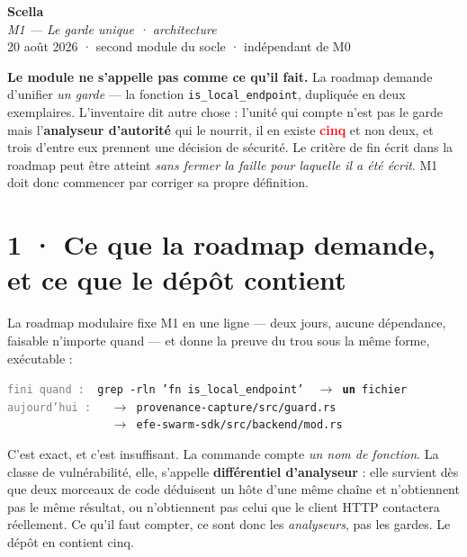 \documentclass[10pt]{article}
\newcommand{\pire}[1]{\textcolor{red}{\textbf{#1}}}
\newcommand{\sz}[1]{\textcolor{grey}{\small\textsf{#1}}}
\newcommand{\code}[1]{\texttt{\small #1}}
\newcommand{\fl}{$\rightarrow$}
\begin{document}
\begin{center}
{\Huge\bfseries\color{navy} Scella}\\[4pt]
{\large\color{grey}\itshape M1 --- Le garde unique · architecture}\\[4pt]
{\small\color{grey} 20 août 2026 \; · \; second module du socle \; · \; indépendant de M0}
\end{center}
\vspace{2pt}

\begin{these}
\textbf{Le module ne s'appelle pas comme ce qu'il fait.} La roadmap demande d'unifier \emph{un
garde} --- la fonction \code{is\_local\_endpoint}, dupliquée en deux exemplaires. L'inventaire dit
autre chose : l'unité qui compte n'est pas le garde mais l'\textbf{analyseur d'autorité} qui le
nourrit, il en existe \pire{cinq} et non deux, et trois d'entre eux prennent une décision de
sécurité. Le critère de fin écrit dans la roadmap peut être atteint \emph{sans fermer la faille pour
laquelle il a été écrit}. M1 doit donc commencer par corriger sa propre définition.
\end{these}

\section{1 · Ce que la roadmap demande, et ce que le dépôt contient}

La roadmap modulaire fixe M1 en une ligne --- deux jours, aucune dépendance, faisable n'importe
quand --- et donne la preuve du trou sous la même forme, exécutable :

\begin{extrait}
\code{\sz{fini quand :}\ \ grep -rln 'fn is\_local\_endpoint' \ \fl{} \textbf{un} fichier} \\
\code{\sz{aujourd'hui :}\ \ \ \fl{} provenance-capture/src/guard.rs} \\
\code{\sz{\ \ \ \ \ \ \ \ \ \ \ \ \ \ }\ \ \fl{} efe-swarm-sdk/src/backend/mod.rs}
\end{extrait}

C'est exact, et c'est insuffisant. La commande compte \emph{un nom de fonction}. La classe de
vulnérabilité, elle, s'appelle \textbf{différentiel d'analyseur} : elle survient dès que deux morceaux
de code déduisent un hôte d'une même chaîne et n'obtiennent pas le même résultat, ou n'obtiennent pas
celui que le client HTTP contactera réellement. Ce qu'il faut compter, ce sont donc les
\emph{analyseurs}, pas les gardes. Le dépôt en contient cinq.
\end{document}
